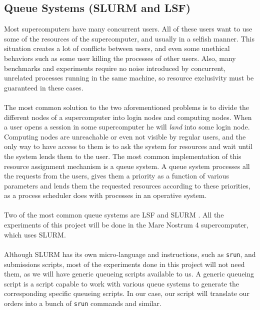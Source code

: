 \subsection{Queue Systems (SLURM and LSF)}
\label{subsec:hpc_queues}
Most supercomputers have many concurrent users. All of these users want to use some of the resources of the supercomputer, and usually in a selfish manner. This situation creates a lot of conflicts between users, and even some unethical behaviors such as some user killing the processes of other users. Also, many benchmarks and experiments require no noise introduced by concurrent, unrelated processes running in the same machine, so resource exclusivity must be guaranteed in these cases.\\
\\
The most common solution to the two aforementioned problems is to divide the different nodes of a supercomputer into login nodes and computing nodes. When a user opens a session in some supercomputer he will \textit{land} into some login node. Computing nodes are unreachable or even not visible by regular users, and the only way to have access to them is to ask the system for resources and wait until the system lends them to the user. The most common implementation of this resource assignment mechanism is a queue system. A queue system processes all the requests from the users, gives them a priority as a function of various parameters and lends them the requested resources according to these priorities, as a process scheduler does with processes in an operative system.\\
\\
Two of the most common queue systems are LSF \cite{zhou1992lsf} and SLURM \cite{yoo2003slurm}. All the experiments of this project will be done in the Mare Nostrum 4 supercomputer, which uses SLURM.\\
\\
Although SLURM has its own micro-language and instructions, such as \verb|srun|, and submissions scripts, most of the experiments done in this project will not need them, as we will have generic queueing scripts available to us. A generic queueing script is a script capable to work with various queue systems to generate the corresponding specific queueing scripts. In our case, our script will translate our orders into a bunch of \verb|srun| commands and similar.\\
